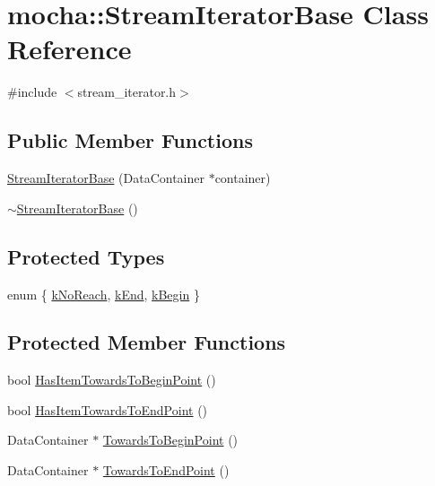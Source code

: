 \hypertarget{classmocha_1_1_stream_iterator_base}{
\section{mocha::StreamIteratorBase Class Reference}
\label{classmocha_1_1_stream_iterator_base}
}


{\ttfamily \#include $<$stream\_\-iterator.h$>$}

\subsection*{Public Member Functions}
\begin{DoxyCompactItemize}
\item 
\hyperlink{classmocha_1_1_stream_iterator_base_a469d6b7e713017df1d69c6d093e19511}{StreamIteratorBase} (DataContainer $\ast$container)
\item 
\hyperlink{classmocha_1_1_stream_iterator_base_ad46946523602bcd63e3110d0a7ff2829}{$\sim$StreamIteratorBase} ()
\end{DoxyCompactItemize}
\subsection*{Protected Types}
\begin{DoxyCompactItemize}
\item 
enum \{ \hyperlink{classmocha_1_1_stream_iterator_base_ae0d52323ced87ab0bdf801d5689eff26a223ee05592fe9df6536f198736863ae8}{kNoReach}, 
\hyperlink{classmocha_1_1_stream_iterator_base_ae0d52323ced87ab0bdf801d5689eff26a05b3219d79b2ea0bfda435b9abbb005c}{kEnd}, 
\hyperlink{classmocha_1_1_stream_iterator_base_ae0d52323ced87ab0bdf801d5689eff26a4acb504ba45be97debd916f1f90c39f1}{kBegin}
 \}
\end{DoxyCompactItemize}
\subsection*{Protected Member Functions}
\begin{DoxyCompactItemize}
\item 
bool \hyperlink{classmocha_1_1_stream_iterator_base_a55b204d0d6f325a02c72d3803dcf8148}{HasItemTowardsToBeginPoint} ()
\item 
bool \hyperlink{classmocha_1_1_stream_iterator_base_a3e1363f65e2b71793bb53e7944495223}{HasItemTowardsToEndPoint} ()
\item 
DataContainer $\ast$ \hyperlink{classmocha_1_1_stream_iterator_base_a7c10bd077f0c0f70d4b04c160a858d93}{TowardsToBeginPoint} ()
\item 
DataContainer $\ast$ \hyperlink{classmocha_1_1_stream_iterator_base_a71d7d65b8eb7c0b77f3fe6ad038d366a}{TowardsToEndPoint} ()
\end{DoxyCompactItemize}
